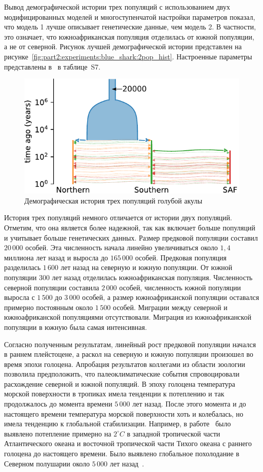 Вывод демографической истории трех популяций с использованием двух модифицированных моделей и многоступенчатой настройки параметров показал, что модель 1 лучше описывает генетические данные, чем модель 2.
В частности, это означает, что южноафриканская популяция отделилась от южной популяции, а не от северной.
Рисунок лучшей демографической истории представлен на рисунке~\ref{fig:part2:experiments:blue_shark:2pop_hist}.
Настроенные параметры представлены в~\cite{nikolic2022stepping} в таблице~S7.

\begin{figure}[ht]
    \centering
        \includegraphics[width=0.6\linewidth]{images_experiments/blue_shark/3pop_history.pdf}
    \caption{Демографическая история трех популяций голубой акулы}
    \label{fig:part2:experiments:blue_shark:3pop_hist}
\end{figure}

История трех популяций немного отличается от истории двух популяций.
Отметим, что она является более надежной, так как включает больше популяций и учитывает больше генетических данных.
Размер предковой популяции составил $20{\,}000$ особей.
Эта численность начала линейно увеличиваться около $1{,}4$ миллиона лет назад и выросла до $165{\,}000$ особей.
Предковая популяция разделилась $1{\,}600$ лет назад на северную и южную популяции.
От южной популяции 300 лет назад отделилась южноафриканская популяция.
Численность северной популяции составила $2{\,}000$ особей, численность южной популяции выросла с $1{\,}500$ до $3{\,}000$ особей, а размер южноафриканской популяции оставался примерно постоянным около $1{\,}500$ особей.
Миграции между северной и южноафриканской популяциями отсутствовали.
Миграция из южноафриканской популяции в южную была самая интенсивная.

Согласно полученным результатам, линейный рост предковой популяции начался в раннем плейстоцене, а раскол на северную и южную популяции произошел во время эпохи голоцена.
Апробация результатов коллегами из области зоологии~\cite{nikolic2022stepping} позволила предположить, что палеоклиматические события спровоцировали расхождение северной и южной популяций.
В эпоху голоцена температура морской поверхности в тропиках имела тенденции к потеплению и так продолжалось до момента времени $5{\,}000$ лет назад.
После этого момента и до настоящего времени температура морской поверхности хоть и колебалась, но имела тенденцию к глобальной стабилизации.
Например, в работе~\cite{leduc2010holocene} было выявлено потепление примерно на $2^\circ C$ в западной тропической части Атлантического океана и восточной тропической части Тихого океана с раннего голоцена до настоящего времени.
Было выявлено глобальное похолодание в Северном полушарии около $5{\,}000$ лет назад~\cite{masson2013information}.

